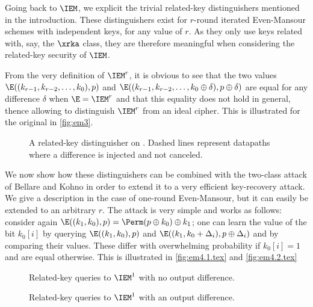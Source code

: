 Going back to $\IEM$, we explicit the
trivial related-key distinguishers mentioned in the introduction. These distinguishers exist
for $r$-round iterated Even-Mansour schemes with independent keys, for any value of $r$.
As they only use keys related with, say, the $\xrka$ class,
they are therefore meaningful when considering the related-key security of $\IEM$.

From the very definition of $\IEM^r$, it
is obvious to see that the two values $\E((k_{r-1}, k_{r-2},\linebreak[1] \ldots, k_0), p)$
and $\E((k_{r-1}, k_{r-2}, \ldots, k_0 \oplus \delta), p \oplus \delta)$ are equal for any
difference $\delta$ when
$\E = \IEM^r$ and that this equality does not hold in general, thence allowing to distinguish
$\IEM^r$ from an ideal cipher. This is illustrated for the original \EM in \autoref{fig:em3}.

\begin{figure}[!htb]
\begin{center}

\caption[A related-key distinguisher on \EM.]{A related-key distinguisher on \EM. Dashed lines represent datapaths where a difference is injected and not canceled.\label{fig:em3}}
\end{center}
\end{figure}

\medskip

We now show how these distinguishers can be combined with the two-class attack of Bellare and Kohno
in order to extend it to a very efficient key-recovery attack. We give a description in the case of one-round
Even-Mansour, but it can easily be extended to an arbitrary $r$. The attack is very simple and works
as follows: consider again $\E((k_1, k_0), p) = \Perm(p \oplus k_0) \oplus k_1$; one can learn
the value of the bit $k_0[i]$ by querying $\E((k_1, k_0), p)$ and
$\E((k_1, k_0 + \Delta_i), p \oplus \Delta_i)$
and by comparing their values. These  differ with overwhelming probability
if $k_0[i] = 1$ and are equal otherwise.
This is illustrated in \autoref{fig:em4.1.tex} and \autoref{fig:em4.2.tex}

\begin{figure}[!htb]
\begin{center}

\caption{Related-key queries to $\IEM^1$ with no output difference.\label{fig:em4.1.tex}}
\end{center}
\end{figure}

\begin{figure}[!htb]
\begin{center}

\caption{Related-key queries to $\IEM^1$ with an output difference.\label{fig:em4.2.tex}}
\end{center}
\end{figure}


